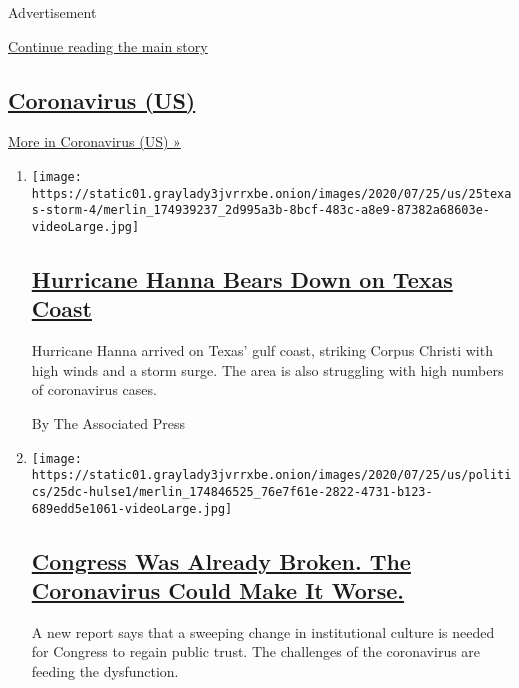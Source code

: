Advertisement

\protect\hyperlink{after-mid1}{Continue reading the main story}

\hypertarget{coronavirus-us}{%
\subsection{\texorpdfstring{\href{/spotlight/coronavirus}{Coronavirus
(US)}}{Coronavirus (US)}}\label{coronavirus-us}}

\href{/spotlight/coronavirus}{More in Coronavirus (US) »}

\begin{enumerate}
\def\labelenumi{\arabic{enumi}.}
\item
  \texttt{[image: https://static01.graylady3jvrrxbe.onion/images/2020/07/25/us/25texas-storm-4/merlin\_174939237\_2d995a3b-8bcf-483c-a8e9-87382a68603e-videoLarge.jpg]}

  \hypertarget{hurricane-hanna-bears-down-on-texas-coast}{%
  \subsection{\texorpdfstring{\href{/video/us/100000007256924/hurricane-hanna-texas.html}{Hurricane
  Hanna Bears Down on Texas
  Coast}}{Hurricane Hanna Bears Down on Texas Coast}}\label{hurricane-hanna-bears-down-on-texas-coast}}

  Hurricane Hanna arrived on Texas' gulf coast, striking Corpus Christi
  with high winds and a storm surge. The area is also struggling with
  high numbers of coronavirus cases.

  By The Associated Press
\item
  \texttt{[image: https://static01.graylady3jvrrxbe.onion/images/2020/07/25/us/politics/25dc-hulse1/merlin\_174846525\_76e7f61e-2822-4731-b123-689edd5e1061-videoLarge.jpg]}

  \hypertarget{congress-was-already-broken-the-coronavirus-could-make-it-worse}{%
  \subsection{\texorpdfstring{\href{/2020/07/25/us/congress-broken-partisanship-coronavirus.html}{Congress
  Was Already Broken. The Coronavirus Could Make It
  Worse.}}{Congress Was Already Broken. The Coronavirus Could Make It Worse.}}\label{congress-was-already-broken-the-coronavirus-could-make-it-worse}}

  A new report says that a sweeping change in institutional culture is
  needed for Congress to regain public trust. The challenges of the
  coronavirus are feeding the dysfunction.


\end{enumerate}
